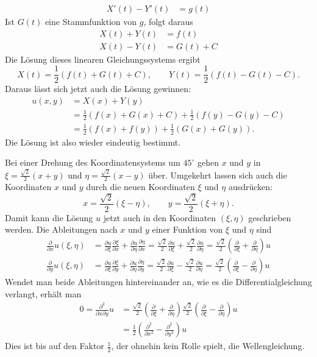 \begin{loesung}
\begin{teilaufgaben}
\begin{align*}
X'(t)-Y'(t)&=g(t)
\end{align*}
Ist $G(t)$ eine Stammfunktion von $g$, folgt daraus
\begin{align*}
X(t)+Y(t)&=f(t)\\
X(t)-Y(t)&=G(t) + C
\end{align*}
Die Lösung dieses linearen Gleichungssystems ergibt
\[
X(t)=\frac12(f(t)+G(t)+C),\qquad 
Y(t)=\frac12(f(t)-G(t)-C).
\]
Daraus lässt sich jetzt auch die Lösung gewinnen:
\begin{align*}
u(x,y)&=X(x)+Y(y)
\\
&=
\frac12(f(x)+G(x)+C)
+
\frac12(f(y)-G(y)-C)
\\
&=
\frac12(f(x)+f(y))+\frac12(G(x)+G(y)).
\end{align*}
Die Lösung ist also wieder eindeutig bestimmt.
\item
Bei einer Drehung des Koordinatensystems um $45^\circ$ gehen
$x$ und $y$ in $\xi=\frac{\sqrt{2}}2(x+y)$ und $\eta=\frac{\sqrt{2}}2(x-y)$
über. Umgekehrt lassen sich auch die Koordinaten $x$ und $y$ durch
die neuen Koordinaten $\xi$ und $\eta$ ausdrücken:
\[
x=\frac{\sqrt{2}}2(\xi-\eta),\qquad y=\frac{\sqrt{2}}2(\xi+\eta).
\]
Damit kann die Lösung $u$ jetzt auch in den Koordinaten $(\xi,\eta)$
geschrieben werden. Die Ableitungen nach $x$ und $y$
einer Funktion von $\xi$
und $\eta$ sind
\begin{align*}
\frac{\partial}{\partial x}u(\xi,\eta)
&=
\frac{\partial u}{\partial \xi}\frac{\partial \xi}{\partial x}
+
\frac{\partial u}{\partial \eta}\frac{\partial \eta}{\partial x}
=
\frac{\sqrt{2}}2\frac{\partial u}{\partial\xi}
+\frac{\sqrt{2}}2\frac{\partial u}{\partial\eta}
=
\frac{\sqrt{2}}2\left(\frac{\partial}{\partial \xi}+\frac{\partial}{\partial\eta}\right)u
\\
\frac{\partial}{\partial y}u(\xi,\eta)
&=
\frac{\partial u}{\partial \xi}\frac{\partial \xi}{\partial y}
+
\frac{\partial u}{\partial \eta}\frac{\partial \eta}{\partial y}
=
\frac{\sqrt{2}}2\frac{\partial u}{\partial\xi}
-\frac{\sqrt{2}}2\frac{\partial u}{\partial\eta}
=
\frac{\sqrt{2}}2\left(\frac{\partial}{\partial \xi}-\frac{\partial}{\partial\eta}\right)u
\end{align*}
Wendet man beide Ableitungen hintereinander an, wie es die
Differentialgleichung verlangt, erhält man
\begin{align*}
0=\frac{\partial^2}{\partial x\partial y}u
&=
\frac{\sqrt{2}}2
\left(\frac{\partial}{\partial \xi}+\frac{\partial}{\partial\eta}\right)
\frac{\sqrt{2}}2
\left(\frac{\partial}{\partial \xi}-\frac{\partial}{\partial\eta}\right)u
\\
&=
\frac12
\left(
\frac{\partial^2}{\partial x^2}-\frac{\partial^2}{\partial y^2}
\right)u
\end{align*}
Dies ist bis auf den Faktor $\frac12$, der ohnehin kein Rolle spielt,
die Wellengleichung.
\qedhere
\end{teilaufgaben}
\end{loesung}
